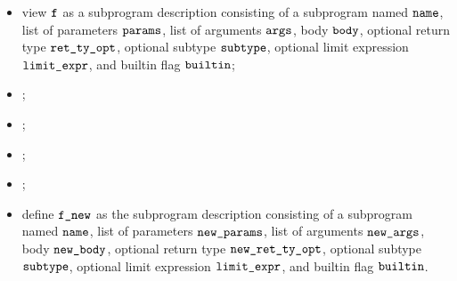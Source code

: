 \ProseParagraph
\AllApply
\begin{itemize}
  \item view $\texttt{f}$ as a subprogram description consisting of a subprogram named $\texttt{name}$,
        list of parameters $\params$, list of arguments $\args$, body $\vbody$,
        optional return type $\rettyopt$, optional subtype $\texttt{subtype}$,
        optional limit expression $\texttt{limit\_expr}$, and builtin flag $\texttt{builtin}$;
  \item \Proserenamelocalsargs{$\args$}{$\newargs$};
  \item \Proserenamelocalsnamedargs{$\params$}{$\newparams$};
  \item \Proserenamelocalsstmt{$\vbody$}{$\vnewbody$};
  \item \Prosemapopt{$\renamelocalsty$}{$\rettyopt$}{\\ $\newrettyopt$};
  \item define $\texttt{f\_new}$ as the subprogram description consisting of a subprogram named $\texttt{name}$,
    list of parameters $\newparams$, list of arguments $\newargs$, body $\vnewbody$,
    optional return type $\newrettyopt$, optional subtype $\texttt{subtype}$,
    optional limit expression $\texttt{limit\_expr}$, and builtin flag $\texttt{builtin}$.
\end{itemize}


